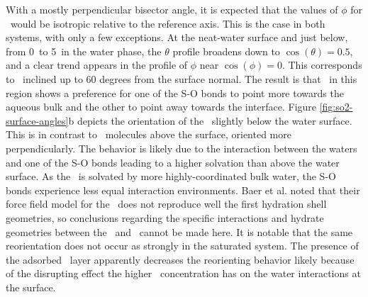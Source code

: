  With a mostly perpendicular bisector angle, it is expected that the values of $\phi$ for \suldiox~would be isotropic relative to the reference axis. This is the case in both systems, with only a few exceptions. At the neat-water surface and just below, from 0\angs~to 5\angs~in the water phase, the $\theta$ profile broadens down to $\cos(\theta)=0.5$, and a clear trend appears in the profile of $\phi$ near $\cos(\phi)=0$. This corresponds to \suldiox~inclined up to 60 degrees from the surface normal. The result is that \suldiox~in this region shows a preference for one of the S-O bonds to point more towards the aqueous bulk and the other to point away towards the interface. Figure \ref{fig:so2-surface-angles}b depicts the orientation of the \suldiox~slightly below the water surface. This is in contrast to \suldiox~molecules above the surface, oriented more perpendicularly. The behavior is likely due to the interaction between the waters and one of the S-O bonds leading to a higher solvation than above the water surface. As the \suldiox~is solvated by more highly-coordinated bulk water, the S-O bonds experience less equal interaction environments. Baer et al. noted that their force field model for the \suldiox~does not reproduce well the first hydration shell geometries,\cite{Baer2010} so conclusions regarding the specific interactions and hydrate geometries between the \suldiox~and \wat~cannot be made here. It is notable that the same reorientation does not occur as strongly in the saturated system. The presence of the adsorbed \suldiox~layer apparently decreases the reorienting behavior likely because of the disrupting effect the higher \suldiox~concentration has on the water interactions at the surface. %


